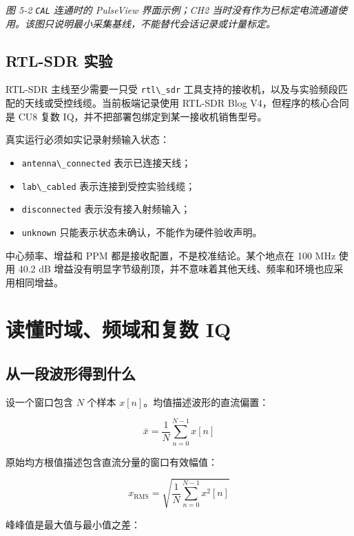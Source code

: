 \emph{图 5-2 \passthrough{\lstinline!CAL!} 连通时的 PulseView
界面示例；CH2
当时没有作为已标定电流通道使用。该图只说明最小采集基线，不能替代会话记录或计量标定。}

\subsection{RTL-SDR 实验}\label{src-experiment-case5-rtl-bom}

RTL-SDR 主线至少需要一只受 \passthrough{\lstinline!rtl\_sdr!}
工具支持的接收机，以及与实验频段匹配的天线或受控线缆。当前板端记录使用
RTL-SDR Blog V4，但程序的核心合同是 CU8 复数
IQ，并不把部署包绑定到某一接收机销售型号。

真实运行必须如实记录射频输入状态：

\begin{itemize}
\tightlist
\item
  \passthrough{\lstinline!antenna\_connected!} 表示已连接天线；
\item
  \passthrough{\lstinline!lab\_cabled!} 表示连接到受控实验线缆；
\item
  \passthrough{\lstinline!disconnected!} 表示没有接入射频输入；
\item
  \passthrough{\lstinline!unknown!}
  只能表示状态未确认，不能作为硬件验收声明。
\end{itemize}

中心频率、增益和 PPM 都是接收配置，不是校准结论。某个地点在 100 MHz 使用
40.2 dB
增益没有明显字节级削顶，并不意味着其他天线、频率和环境也应采用相同增益。

\section{读懂时域、频域和复数
IQ}\label{src-experiment-case5-signal-theory}

\subsection{从一段波形得到什么}\label{src-experiment-case5-time-domain}

设一个窗口包含 \(N\) 个样本 \(x[n]\)。均值描述波形的直流偏置：

\[
\bar{x}=\frac{1}{N}\sum_{n=0}^{N-1}x[n]
\]

原始均方根值描述包含直流分量的窗口有效幅值：

\[
x_{\mathrm{RMS}}=\sqrt{\frac{1}{N}\sum_{n=0}^{N-1}x^2[n]}
\]

峰峰值是最大值与最小值之差：

